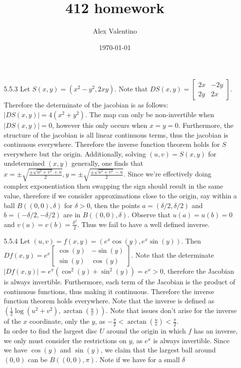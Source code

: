 \documentclass[12pt, letterpaper]{article}
\date{\today}
\author{Alex Valentino}
\title{412 homework}
\begin{document}
\begin{enumerate}
	\item[5.5.3] Let $S(x,y) = (x^2 - y^2, 2xy)$.  Note that 
	$DS(x,y) = \begin{bmatrix} 2x & -2y\\ 2y & 2x \end{bmatrix}.$ 
	Therefore the determinate of the jacobian is as follows:
	$|DS(x,y)| = 4(x^2 + y^2)$.  The map can only be non-invertible 
	when $|DS(x,y)| = 0$, however this only occurs when $x=y=0$.  
	Furthermore, the structure of the jacobian is all linear continuous
	terms, thus the jacobian is continuous everywhere.  Therefore 
	the inverse function theorem holds for $S$ everywhere but the 
	origin.  Additionally, solving $(u,v) = S(x,y)$ for undetermined 
	$(x,y)$ generally, one finds that $x = \pm \sqrt{\frac{\pm\sqrt{u^2 + v^2} + u}{2}}, y = \pm\sqrt{\frac{\pm\sqrt{u^2 + v^2} - u}{2}}$.  Since we're effectively  
	doing complex exponentiation then swapping the sign should result in 
	the same value, therefore if we consider approximations close to the origin, 
	say within a ball $B((0,0),\delta)$ for $\delta > 0$, then the points 
	$a = (\delta/2,\delta/2)$ and $b = (-\delta/2,-\delta/2)$ are in $B((0,0),\delta)$.
	Observe that $u(a) = u(b) = 0$ and $v(a) = v(b) = \frac{\delta^2}{2}$.  
	Thus we fail to have a well defined inverse.  
	\item[5.5.4] Let $(u,v) = f(x,y) = (e^x \cos(y), e^x \sin(y))$.
	Then $Df(x,y) = e^x \begin{bmatrix}  \cos(y) & - \sin(y)\\ 
	\sin(y) & \cos(y)
	\end{bmatrix}$.  Note that the determinate $|Df(x,y)| = e^x(\cos^2(y) + \sin^2(y)) = e^x > 0$, therefore the Jacobian is always
	invertible. Furthermore, each term of the Jacobian is the product of 
	continuous functions, thus making it continuous.  Therefore 
	the inverse function theorem holds everywhere.  Note that  the inverse is defined as $(\frac{1}{2}\log ({u^2 + v^2}), 
	\arctan(\frac{u}{v}))$.  Note that issues don't arise for the 
	inverse of the $x$ coordinate, only the $y$, as 
	$- \frac{\pi}{2} < \arctan(\frac{u}{v}) < \frac{\pi}{2}$.  \\
	In order to find the largest disc $U$ around the origin in which $f$ has 
	an inverse, we only must consider the restrictions on $y$, as $e^x$ is always 
	invertible.  Since we have $\cos(y)$ and $\sin(y)$, we claim that the largest 
	ball around $(0,0)$ can be $B((0,0),\pi)$.  Note if we have for a small $\delta$

\end{enumerate}
\end{document}
